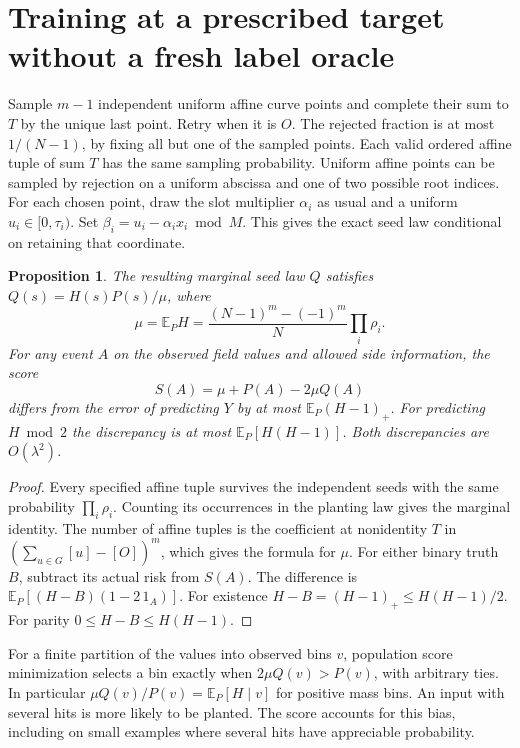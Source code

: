 \documentclass[11pt]{article}
\newtheorem{proposition}{Proposition}
\newcommand{\E}{\mathbb E}
\begin{document}
\section{Training at a prescribed target without a fresh label oracle}

Sample $m-1$ independent uniform affine curve points and complete their
sum to $T$ by the unique last point. Retry when it is $O$. The rejected
fraction is at most $1/(N-1)$, by fixing all but one of the sampled
points. Each valid ordered affine tuple of sum $T$ has the same sampling
probability. Uniform affine points can be sampled by rejection on a
uniform abscissa and one of two possible root indices. For each chosen
point, draw the slot multiplier $\alpha_i$ as usual and a uniform
$u_i\in[0,\tau_i)$. Set $\beta_i=u_i-\alpha_i x_i\bmod M$. This gives the
exact seed law conditional on retaining that coordinate.

\begin{proposition}
The resulting marginal seed law $Q$ satisfies $Q(s)=H(s)P(s)/\mu$,
where
\[
 \mu=\E_P H=\frac{(N-1)^m-(-1)^m}{N}\prod_i\rho_i .
\]
For any event $A$ on the observed field values and allowed side information,
the score
\[
 S(A)=\mu+P(A)-2\mu Q(A)
\]
differs from the error of predicting $Y$ by at most $\E_P(H-1)_+$.
For predicting $H\bmod2$ the discrepancy is at most $\E_P[H(H-1)]$.
Both discrepancies are $O(\lambda^2)$.
\end{proposition}

\begin{proof}
Every specified affine tuple survives the independent seeds with the
same probability $\prod_i\rho_i$. Counting its occurrences in the
planting law gives the marginal identity. The number of affine tuples is
the coefficient at nonidentity $T$ in $(\sum_{u\in G}[u]-[O])^m$,
which gives the formula for $\mu$. For either binary truth $B$,
subtract its actual risk from $S(A)$. The difference is
$\E_P[(H-B)(1-2\,1_A)]$. For existence $H-B=(H-1)_+\le H(H-1)/2$.
For parity $0\le H-B\le H(H-1)$.
\end{proof}

For a finite partition of the values into observed bins $v$, population
score minimization selects a bin exactly when $2\mu Q(v)>P(v)$, with
arbitrary ties. In particular $\mu Q(v)/P(v)=\E_P[H\mid v]$ for positive
mass bins. An input with several hits is more likely to be planted.
The score accounts for this bias, including on small examples where
several hits have appreciable probability.
\end{document}
